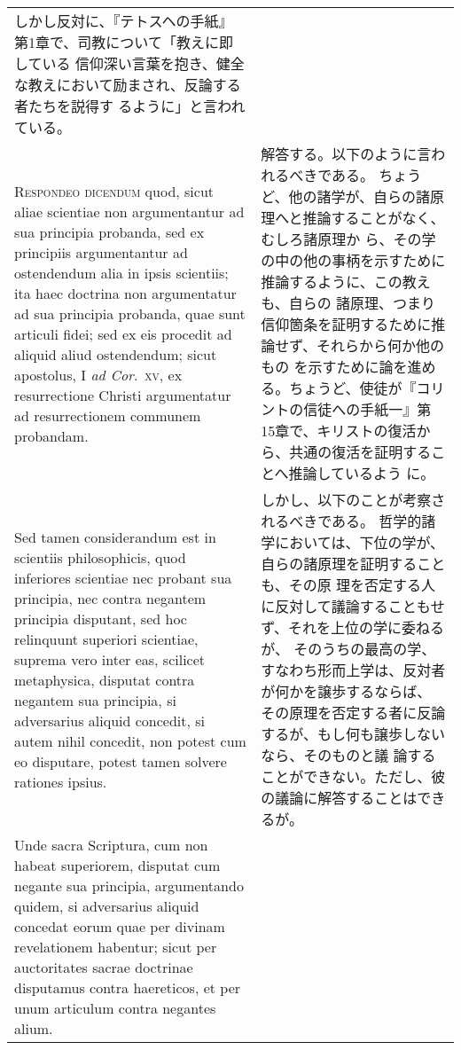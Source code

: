 \documentclass[10pt]{jsarticle} %
\begin{document}
\begin{longtable}{p{21em}p{21em}}
しかし反対に、『テトスヘの手紙』第1章で、司教について「教えに即している
 信仰深い言葉を抱き、健全な教えにおいて励まされ、反論する者たちを説得す
 るように」と言われている。


\\


{\scshape Respondeo dicendum} quod, sicut aliae scientiae
non argumentantur ad sua principia probanda, sed ex principiis
argumentantur ad ostendendum alia in ipsis scientiis; ita haec doctrina
non argumentatur ad sua principia probanda, quae sunt articuli fidei;
sed ex eis procedit ad aliquid aliud ostendendum; sicut apostolus, I {\itshape ad
Cor}.~{\scshape xv}, ex resurrectione Christi argumentatur ad resurrectionem
communem probandam. 



&

解答する。以下のように言われるべきである。
ちょうど、他の諸学が、自らの諸原理へと推論することがなく、むしろ諸原理か
 ら、その学の中の他の事柄を示すために推論するように、この教えも、自らの
 諸原理、つまり信仰箇条を証明するために推論せず、それらから何か他のもの
 を示すために論を進める。ちょうど、使徒が『コリントの信徒への手紙一』第
 15章で、キリストの復活から、共通の復活を証明することへ推論しているよう
 に。


\\


Sed tamen considerandum est in scientiis
philosophicis, quod inferiores scientiae nec probant sua principia, nec
contra negantem principia disputant, sed hoc relinquunt superiori
scientiae, suprema vero inter eas, scilicet metaphysica, disputat contra
negantem sua principia, si adversarius aliquid concedit, si autem nihil
concedit, non potest cum eo disputare, potest tamen solvere rationes
ipsius. 



&

しかし、以下のことが考察されるべきである。
哲学的諸学においては、下位の学が、自らの諸原理を証明することも、その原
 理を否定する人に反対して議論することもせず、それを上位の学に委ねるが、
 そのうちの最高の学、すなわち形而上学は、反対者が何かを譲歩するならば、
 その原理を否定する者に反論するが、もし何も譲歩しないなら、そのものと議
 論することができない。ただし、彼の議論に解答することはできるが。



\\


Unde sacra Scriptura, cum non habeat superiorem, disputat cum
negante sua principia, argumentando quidem, si adversarius aliquid
concedat eorum quae per divinam revelationem habentur; sicut per
auctoritates sacrae doctrinae disputamus contra haereticos, et per unum
articulum contra negantes alium. 




\end{longtable}
\end{document}
